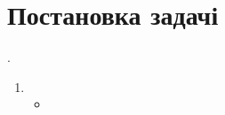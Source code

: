 \documentclass[../../../../document]{subfiles}
\begin{document}
\BeforeChpater{}

\chapter{Постановка задачі}
 \worktheme.\\
\begin{enumerate}
	\item
		\begin{itemize}
			\item 
		\end{itemize}
\end{enumerate}

\AfterChapter{}
\end{document}
